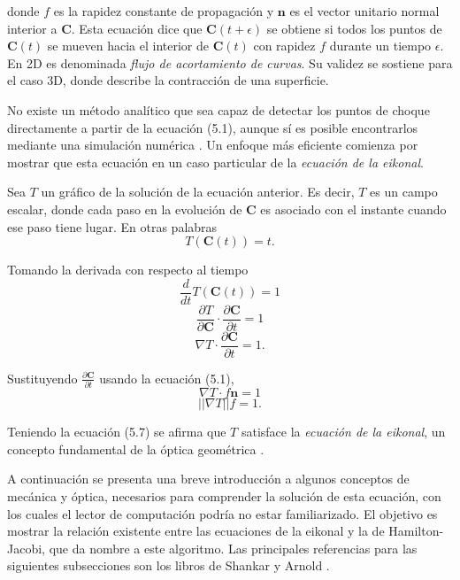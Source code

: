 \noindent
donde $f$ es la rapidez constante de propagación y $\boldsymbol{n}$ es el vector unitario normal interior a $\boldsymbol{C}$. Esta ecuación dice que $\boldsymbol{C}(t + \epsilon)$ se obtiene si todos los puntos de $\boldsymbol{C}(t)$ se mueven hacia el interior de $\boldsymbol{C}(t)$ con rapidez $f$ durante un tiempo $\epsilon$. En 2D es denominada \textit{flujo de acortamiento de curvas}. Su validez se sostiene para el caso 3D, donde describe la contracción de una superficie.

No existe un método analítico que sea capaz de detectar los puntos de choque directamente a partir de la ecuación (5.1), aunque sí es posible encontrarlos mediante una simulación numérica \cite{sethian1996fast}. Un enfoque más eficiente comienza por mostrar que esta ecuación en un caso particular de la \textit{ecuación de la eikonal}.

Sea $T$ un gráfico de la solución de la ecuación anterior. Es decir, $T$ es un campo escalar, donde cada paso en la evolución de $\boldsymbol{C}$ es asociado con el instante cuando ese paso tiene lugar. En otras palabras
\begin{equation}
T(\boldsymbol{C}(t)) = t.
\end{equation}

\noindent
Tomando la derivada con respecto al tiempo
\begin{equation}
\frac{d}{dt}T(\boldsymbol{C}(t)) = 1
\end{equation}
\begin{equation}
\frac{\partial T}{\partial \boldsymbol{C}}\cdot\frac{\partial \boldsymbol{C}}{\partial t} = 1
\end{equation}
\begin{equation}
\nabla T\cdot\frac{\partial \boldsymbol{C}}{\partial t} = 1.
\end{equation}

\noindent
Sustituyendo $\frac{\partial \boldsymbol{C}}{\partial t}$ usando la ecuación (5.1),
\begin{equation}
\nabla T\cdot f\boldsymbol{n} = 1
\end{equation}
\begin{equation}
||\nabla T|| f = 1.
\end{equation}

\noindent
Teniendo la ecuación (5.7) se afirma que $T$ satisface la \textit{ecuación de la eikonal}, un concepto fundamental de la óptica geométrica \cite{luneburg1964mathematical}.

A continuación se presenta una breve introducción a algunos conceptos de mecánica y óptica, necesarios para comprender la solución de esta ecuación, con los cuales el lector de computación podría no estar familiarizado. El objetivo es mostrar la relación existente entre las ecuaciones de la eikonal y la de Hamilton-Jacobi, que da nombre a este algoritmo. Las principales referencias para las siguientes subsecciones son los libros de Shankar \cite{shankar2012principles} y Arnold \cite{arnol2013mathematical}.

